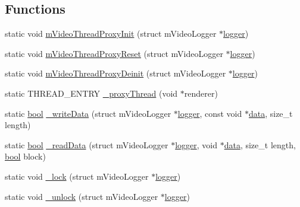 \subsection*{Functions}
\begin{DoxyCompactItemize}
\item 
static void \mbox{\hyperlink{thread-proxy_8c_a6af434b062813108e9046e2742ef9d15}{m\+Video\+Thread\+Proxy\+Init}} (struct m\+Video\+Logger $\ast$\mbox{\hyperlink{libretro_8c_a370b093d59813e9620a3b73b831162c2}{logger}})
\item 
static void \mbox{\hyperlink{thread-proxy_8c_aab76cb56b20c81f5a6bc984c29af7ca8}{m\+Video\+Thread\+Proxy\+Reset}} (struct m\+Video\+Logger $\ast$\mbox{\hyperlink{libretro_8c_a370b093d59813e9620a3b73b831162c2}{logger}})
\item 
static void \mbox{\hyperlink{thread-proxy_8c_a7d6faab8646db46852a09b83af7216e0}{m\+Video\+Thread\+Proxy\+Deinit}} (struct m\+Video\+Logger $\ast$\mbox{\hyperlink{libretro_8c_a370b093d59813e9620a3b73b831162c2}{logger}})
\item 
static T\+H\+R\+E\+A\+D\+\_\+\+E\+N\+T\+RY \mbox{\hyperlink{thread-proxy_8c_a7b9189ee6a6460af05b9f19e95015c98}{\+\_\+proxy\+Thread}} (void $\ast$renderer)
\item 
static \mbox{\hyperlink{libretro_8h_a4a26dcae73fb7e1528214a068aca317e}{bool}} \mbox{\hyperlink{thread-proxy_8c_a163afd173e5992530065bb8ddc2b693e}{\+\_\+write\+Data}} (struct m\+Video\+Logger $\ast$\mbox{\hyperlink{libretro_8c_a370b093d59813e9620a3b73b831162c2}{logger}}, const void $\ast$\mbox{\hyperlink{libretro_8c_a735984d41155bc1032e09bece8f8d66d}{data}}, size\+\_\+t length)
\item 
static \mbox{\hyperlink{libretro_8h_a4a26dcae73fb7e1528214a068aca317e}{bool}} \mbox{\hyperlink{thread-proxy_8c_abcbab73349348e3342c1e7255ed55ee4}{\+\_\+read\+Data}} (struct m\+Video\+Logger $\ast$\mbox{\hyperlink{libretro_8c_a370b093d59813e9620a3b73b831162c2}{logger}}, void $\ast$\mbox{\hyperlink{libretro_8c_a735984d41155bc1032e09bece8f8d66d}{data}}, size\+\_\+t length, \mbox{\hyperlink{libretro_8h_a4a26dcae73fb7e1528214a068aca317e}{bool}} block)
\item 
static void \mbox{\hyperlink{thread-proxy_8c_a5831b9040d25c76acbdf0bc2817acd02}{\+\_\+lock}} (struct m\+Video\+Logger $\ast$\mbox{\hyperlink{libretro_8c_a370b093d59813e9620a3b73b831162c2}{logger}})
\item 
static void \mbox{\hyperlink{thread-proxy_8c_ade51ba82a597a9089d4e639a5fca76fa}{\+\_\+unlock}} (struct m\+Video\+Logger $\ast$\mbox{\hyperlink{libretro_8c_a370b093d59813e9620a3b73b831162c2}{logger}})

\end{DoxyCompactItemize}
